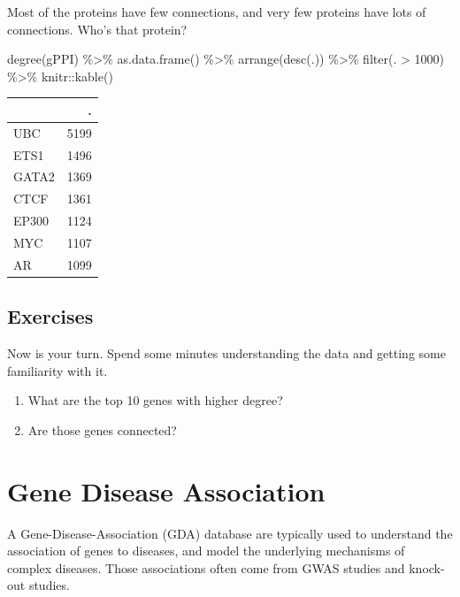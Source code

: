 \documentclass[
]{book}
\newenvironment{Shaded}{\begin{snugshade}}{\end{snugshade}}
\newcommand{\DecValTok}[1]{\textcolor[rgb]{0.00,0.00,0.81}{#1}}
\newcommand{\FunctionTok}[1]{\textcolor[rgb]{0.00,0.00,0.00}{#1}}
\newcommand{\NormalTok}[1]{#1}
\newcommand{\SpecialCharTok}[1]{\textcolor[rgb]{0.00,0.00,0.00}{#1}}
\begin{document}
Most of the proteins have few connections, and very few proteins have lots of connections. Who's that protein?

\begin{Shaded}
\begin{Highlighting}[]
\FunctionTok{degree}\NormalTok{(gPPI) }\SpecialCharTok{\%\textgreater{}\%} 
  \FunctionTok{as.data.frame}\NormalTok{() }\SpecialCharTok{\%\textgreater{}\%} 
  \FunctionTok{arrange}\NormalTok{(}\FunctionTok{desc}\NormalTok{(.)) }\SpecialCharTok{\%\textgreater{}\%}
  \FunctionTok{filter}\NormalTok{(. }\SpecialCharTok{\textgreater{}} \DecValTok{1000}\NormalTok{) }\SpecialCharTok{\%\textgreater{}\%} 
\NormalTok{  knitr}\SpecialCharTok{::}\FunctionTok{kable}\NormalTok{()}
\end{Highlighting}
\end{Shaded}

\begin{tabular}{l|r}
\hline
  & .\\
\hline
UBC & 5199\\
\hline
ETS1 & 1496\\
\hline
GATA2 & 1369\\
\hline
CTCF & 1361\\
\hline
EP300 & 1124\\
\hline
MYC & 1107\\
\hline
AR & 1099\\
\hline
\end{tabular}

\hypertarget{exercises}{%
\subsection{Exercises}\label{exercises}}

Now is your turn. Spend some minutes understanding the data and getting some familiarity with it.

\begin{enumerate}
\def\labelenumi{\arabic{enumi}.}
\item
  What are the top 10 genes with higher degree?
\item
  Are those genes connected?
\end{enumerate}

\hypertarget{GDA}{%
\section{Gene Disease Association}\label{GDA}}

A Gene-Disease-Association (GDA) database are typically used to understand the association of genes to diseases, and model the underlying mechanisms of complex diseases. Those associations often come from GWAS studies and knock-out studies.
\end{document}
